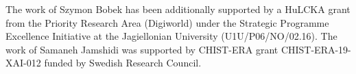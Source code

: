 \documentclass[
 twocolumn,
]{ceurart}
\begin{document}


\begin{acknowledgments}
The work of Szymon Bobek has been additionally supported by a HuLCKA grant from the Priority Research Area (Digiworld) under the Strategic Programme Excellence Initiative at the Jagiellonian University (U1U/P06/NO/02.16).
The work of Samaneh Jamshidi was supported by CHIST-ERA grant CHIST-ERA-19-XAI-012 funded by Swedish Research Council.
\end{acknowledgments}


\end{document}
